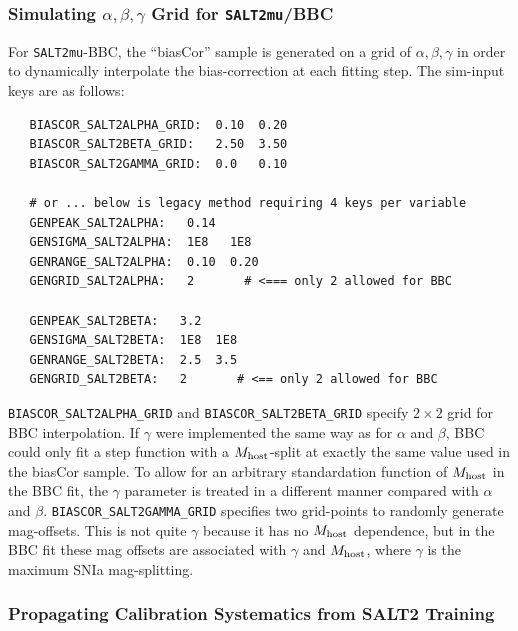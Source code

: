 \documentclass[12pt]{article}
\newcommand{\hostmass}{M_{\rm host}}
\begin{document}
\subsubsection{Simulating $\alpha,\beta,\gamma$ Grid for {\tt SALT2mu}/BBC }
\label{sss:simgrid_forSALT2mu}
For {\tt SALT2mu}-BBC, the ``biasCor'' sample is generated on
a grid of $\alpha,\beta,\gamma$ in order to dynamically interpolate
the bias-correction at each fitting step. The sim-input
keys are as follows:
%
\begin{verbatim}
   BIASCOR_SALT2ALPHA_GRID:  0.10  0.20 
   BIASCOR_SALT2BETA_GRID:   2.50  3.50
   BIASCOR_SALT2GAMMA_GRID:  0.0   0.10

   # or ... below is legacy method requiring 4 keys per variable
   GENPEAK_SALT2ALPHA:   0.14   
   GENSIGMA_SALT2ALPHA:  1E8   1E8
   GENRANGE_SALT2ALPHA:  0.10  0.20
   GENGRID_SALT2ALPHA:   2       # <=== only 2 allowed for BBC

   GENPEAK_SALT2BETA:   3.2 
   GENSIGMA_SALT2BETA:  1E8  1E8 
   GENRANGE_SALT2BETA:  2.5  3.5
   GENGRID_SALT2BETA:   2       # <== only 2 allowed for BBC
\end{verbatim}
%
{\tt BIASCOR\_SALT2ALPHA\_GRID} and {\tt BIASCOR\_SALT2BETA\_GRID}
specify $2\times 2$ grid for BBC interpolation.
%
If $\gamma$ were implemented the same way as for $\alpha$ and $\beta$, 
BBC could only fit a step function with a $\hostmass$-split 
at exactly the same value used in the biasCor sample.
To allow for an arbitrary standardation function of $\hostmass$ 
in the BBC fit,
the $\gamma$ parameter is treated in a different manner compared
with $\alpha$ and $\beta$. {\tt BIASCOR\_SALT2GAMMA\_GRID} specifies
two grid-points to randomly generate mag-offsets. This is not
quite $\gamma$ because it has no $\hostmass$ dependence, but in the
BBC fit these mag offsets are associated with $\gamma$ and $\hostmass$,
where $\gamma$ is the maximum SNIa mag-splitting.


\clearpage
\subsubsection{Propagating Calibration Systematics from SALT2 Training}
\label{sss:trainopt}
\end{document}
